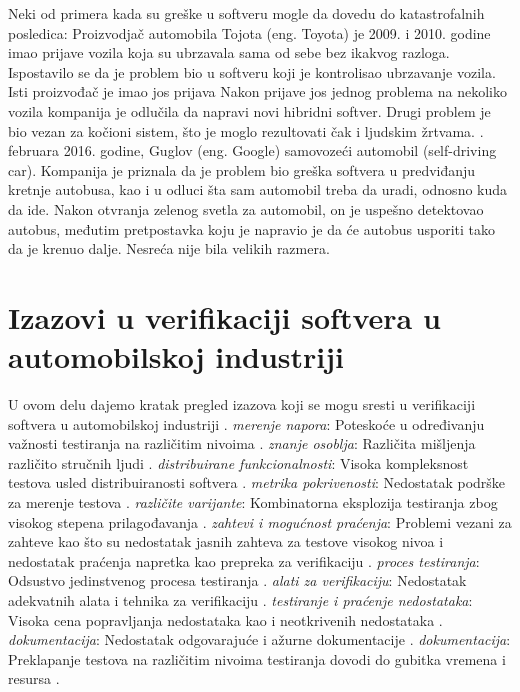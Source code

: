 \documentclass{article}
\begin{document}
\bigbreak
Neki od primera kada su greške u softveru mogle da dovedu do katastrofalnih posledica:
\bigbreak
Proizvodjač automobila Tojota (eng. Toyota) je 2009. i 2010. godine imao prijave vozila koja su ubrzavala sama od sebe bez ikakvog razloga. Ispostavilo se da je problem bio u softveru koji je kontrolisao ubrzavanje vozila. Isti proizvođač je imao jos prijava Nakon prijave jos jednog problema na nekoliko vozila kompanija je odlučila da napravi novi hibridni softver. Drugi problem je bio vezan za kočioni sistem, što je moglo rezultovati čak i ljudskim žrtvama. 
. februara 2016. godine, Guglov (eng. Google) samovozeći automobil (self-driving car). Kompanija je priznala da je problem bio greška softvera u predviđanju kretnje autobusa, kao i u odluci šta sam automobil treba da uradi, odnosno kuda da ide. Nakon otvranja zelenog svetla za automobil, on je uspešno detektovao autobus, međutim pretpostavka koju je napravio je da će autobus usporiti tako da je krenuo dalje. Nesreća nije bila velikih razmera.

\section{Izazovi u verifikaciji softvera u automobilskoj industriji}

U ovom delu dajemo kratak pregled izazova koji se mogu sresti u verifikaciji softvera u automobilskoj industriji \cite{ref13}\cite{ref14}\cite{ref15}.
\bigbreak
\textit{merenje napora}: Poteskoće u određivanju važnosti testiranja na različitim nivoima \cite{ref14}.
\bigbreak
\textit{znanje osoblja}: Različita mišljenja različito stručnih ljudi \cite{ref14}.
\bigbreak
\textit{distribuirane funkcionalnosti}: Visoka kompleksnost testova usled distribuiranosti softvera \cite{ref14}.
\bigbreak
\textit{metrika pokrivenosti}: Nedostatak podrške za merenje testova \cite{ref14}. 
\bigbreak
\textit{različite varijante}: Kombinatorna eksplozija testiranja zbog visokog stepena prilagođavanja \cite{ref14}.
\bigbreak
\textit{zahtevi i mogućnost praćenja}: Problemi vezani za zahteve kao što su nedostatak jasnih zahteva za testove visokog nivoa i nedostatak praćenja napretka kao prepreka za verifikaciju \cite{ref13}.
\bigbreak
\textit{proces testiranja}: Odsustvo jedinstvenog procesa testiranja \cite{ref13}.
\bigbreak
\textit{alati za verifikaciju}: Nedostatak adekvatnih alata i tehnika za verifikaciju \cite{ref13}.
\bigbreak
\textit{testiranje i praćenje nedostataka}: Visoka cena popravljanja nedostataka kao i neotkrivenih nedostataka \cite{ref13}.
\bigbreak
\textit{dokumentacija}: Nedostatak odgovarajuće i ažurne dokumentacije \cite{ref13}.
\bigbreak
\textit{dokumentacija}: Preklapanje testova na različitim nivoima testiranja dovodi do gubitka vremena i resursa \cite{ref15}.
\end{document}
